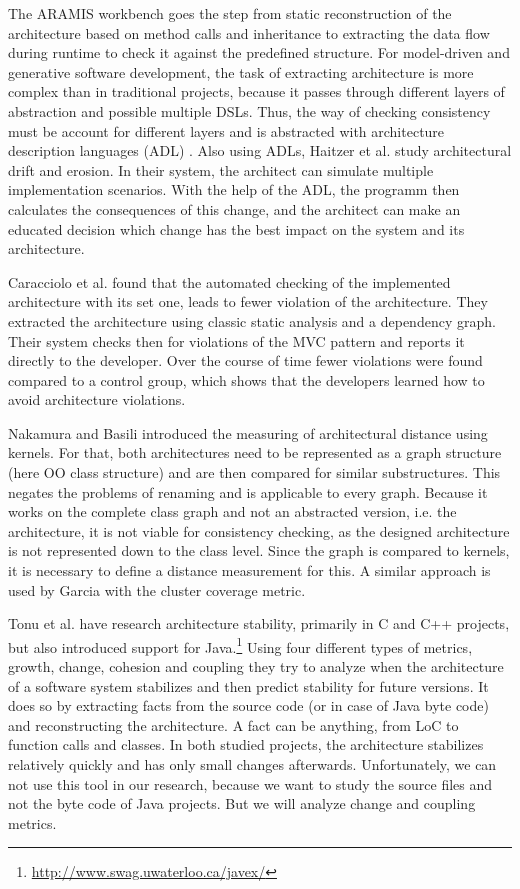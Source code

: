 \documentclass[conference]{IEEEtran}
\begin{document}
The ARAMIS workbench \cite{Aramis} goes the step from static reconstruction of the architecture based on method calls and inheritance to extracting the data flow during runtime to check it against the predefined structure. 
For model-driven and generative software development, the task of extracting architecture is more complex than in traditional projects, because it passes through different layers of abstraction and possible multiple DSLs. 
Thus, the way of checking consistency must be account for different layers and is abstracted with architecture description languages (ADL) \cite{ArcCons,Arc-MDSE}. 
Also using ADLs, Haitzer et al. \cite{Arc-Decision} study architectural drift and erosion. In their system, the architect can simulate multiple implementation scenarios. With the help of the ADL, the programm then calculates the consequences of this change, and the architect can make an educated decision which change has the best impact on the system and its architecture. 

Caracciolo et al. \cite{ArcConf} found that the automated checking of the implemented architecture with its set one, leads to fewer violation of the architecture. They extracted the architecture using classic static analysis and a dependency graph. Their system checks then for violations of the MVC pattern and reports it directly to the developer. Over the course of time fewer violations were found compared to a control group, which shows that the developers learned how to avoid architecture violations.

Nakamura and Basili \cite{StructDist} introduced the measuring of architectural distance using kernels. For that, both architectures need to be represented as a graph structure (here OO class structure) and are then compared for similar substructures. This negates the problems of renaming and is applicable to every graph. 
Because it works on the complete class graph and not an abstracted version, i.e. the architecture, it is not viable for consistency checking, as the designed architecture is not represented down to the class level. 
Since the graph is compared to kernels, it is necessary to define a distance measurement for this. A similar approach is used by Garcia \cite{arcade-thesis} with the cluster coverage metric.

Tonu et al. \cite{Swag} have research architecture stability, primarily in C and C++ projects, but also introduced support for Java.\footnote{\url{http://www.swag.uwaterloo.ca/javex/}} Using four different types of metrics, growth, change, cohesion and coupling they try to analyze when the architecture of a software system stabilizes and then predict stability for future versions. It does so by extracting facts from the source code (or in case of Java byte code) and reconstructing the architecture. A fact can be anything, from LoC to function calls and classes. 
In both studied projects, the architecture stabilizes relatively quickly and has only small changes afterwards. Unfortunately, we can not use this tool in our research, because we want to study the source files and not the byte code of Java projects. But we will analyze change and coupling metrics.
\end{document}
